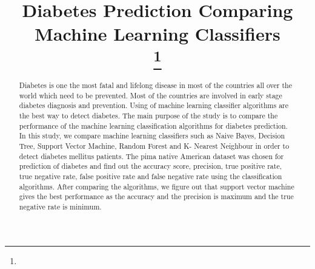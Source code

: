 \documentclass[conference]{IEEEtran}
\begin{document}
	
	\title{Diabetes Prediction Comparing Machine Learning Classifiers\\
		\thanks{}
	}
	\author{
		\and
		\and
		\and
}
	\maketitle
	
\begin{abstract}
		Diabetes is one the most fatal and lifelong disease in most of the countries all over the world which need to be prevented. Most of the countries are involved in early stage diabetes diagnosis and prevention. Using of machine learning classifier algorithms are the best way to detect diabetes. The main purpose of the study is to compare the performance of the machine learning classification algorithms for diabetes prediction. In this study, we compare machine learning classifiers such as Naive Bayes, Decision Tree, Support Vector Machine, Random Forest and K- Nearest Neighbour in order to detect diabetes mellitus patients. The pima native American dataset was chosen for prediction of diabetes and find out the accuracy score, precision, true positive rate, true negative rate, false positive rate and false negative rate using the classification algorithms. After comparing the algorithms, we figure out that support vector machine gives the best performance as the accuracy and the precision is maximum and the true negative rate is minimum.
\end{abstract}
	
\end{document}
